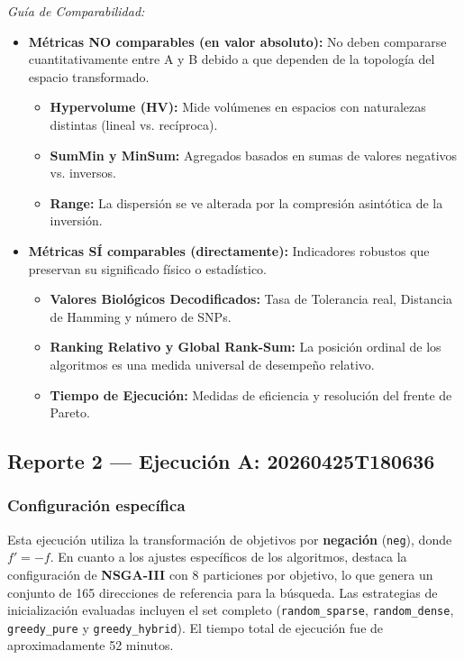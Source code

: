 \documentclass[a4paper,10pt]{article}
\begin{document}
\textit{Guía de Comparabilidad:}
\begin{itemize}
    \item \textbf{Métricas NO comparables (en valor absoluto):} No deben compararse cuantitativamente entre A y B debido a que dependen de la topología del espacio transformado.
    \begin{itemize}
        \item \textbf{Hypervolume (HV):} Mide volúmenes en espacios con naturalezas distintas (lineal vs. recíproca).
        \item \textbf{SumMin y MinSum:} Agregados basados en sumas de valores negativos vs. inversos.
        \item \textbf{Range:} La dispersión se ve alterada por la compresión asintótica de la inversión.
    \end{itemize}
    \item \textbf{Métricas SÍ comparables (directamente):} Indicadores robustos que preservan su significado físico o estadístico.
    \begin{itemize}
        \item \textbf{Valores Biológicos Decodificados:} Tasa de Tolerancia real, Distancia de Hamming y número de SNPs.
        \item \textbf{Ranking Relativo y Global Rank-Sum:} La posición ordinal de los algoritmos es una medida universal de desempeño relativo.
        \item \textbf{Tiempo de Ejecución:} Medidas de eficiencia y resolución del frente de Pareto.
    \end{itemize}
\end{itemize}

\subsection{Reporte 2 — Ejecución A: 20260425T180636}
\label{sec:reporte2}

\subsubsection{Configuración específica}
Esta ejecución utiliza la transformación de objetivos por \textbf{negación} (\texttt{neg}), donde $f' = -f$. En cuanto a los ajustes específicos de los algoritmos, destaca la configuración de \textbf{NSGA-III} con 8 particiones por objetivo, lo que genera un conjunto de 165 direcciones de referencia para la búsqueda. Las estrategias de inicialización evaluadas incluyen el set completo (\texttt{random\_sparse}, \texttt{random\_dense}, \texttt{greedy\_pure} y \texttt{greedy\_hybrid}). El tiempo total de ejecución fue de aproximadamente 52 minutos.
\end{document}
